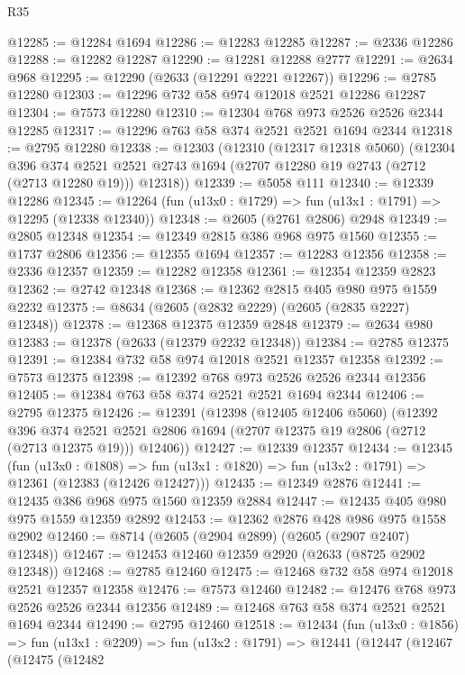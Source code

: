 \begin{lexlean}{R35}
\begin{coremodule}
@12285 := @12284 @1694
@12286 := @12283 @12285
@12287 := @2336 @12286
@12288 := @12282 @12287
@12290 := @12281 @12288 @2777
@12291 := @2634 @968
@12295 := @12290 (@2633 (@12291 @2221 @12267))
@12296 := @2785 @12280
@12303 := @12296 @732 @58 @974 @12018 @2521 @12286 @12287
@12304 := @7573 @12280
@12310 := @12304 @768 @973 @2526 @2526 @2344 @12285
@12317 := @12296 @763 @58 @374 @2521 @2521 @1694 @2344
@12318 := @2795 @12280
@12338 := @12303
    (@12310
      (@12317 @12318 @5060)
      (@12304
        @396
        @374
        @2521
        @2521
        @2743
        @1694
        (@2707 @12280 @19 @2743 (@2712 (@2713 @12280 @19)))
        @12318))
@12339 := @5058 @111
@12340 := @12339 @12286
@12345 := @12264 (fun (u13x0 : @1729) => fun (u13x1 : @1791) => @12295 (@12338 @12340))
@12348 := @2605 (@2761 @2806) @2948
@12349 := @2805 @12348
@12354 := @12349 @2815 @386 @968 @975 @1560
@12355 := @1737 @2806
@12356 := @12355 @1694
@12357 := @12283 @12356
@12358 := @2336 @12357
@12359 := @12282 @12358
@12361 := @12354 @12359 @2823
@12362 := @2742 @12348
@12368 := @12362 @2815 @405 @980 @975 @1559 @2232
@12375 := @8634 (@2605 (@2832 @2229) (@2605 (@2835 @2227) @12348))
@12378 := @12368 @12375 @12359 @2848
@12379 := @2634 @980
@12383 := @12378 (@2633 (@12379 @2232 @12348))
@12384 := @2785 @12375
@12391 := @12384 @732 @58 @974 @12018 @2521 @12357 @12358
@12392 := @7573 @12375
@12398 := @12392 @768 @973 @2526 @2526 @2344 @12356
@12405 := @12384 @763 @58 @374 @2521 @2521 @1694 @2344
@12406 := @2795 @12375
@12426 := @12391
    (@12398
      (@12405 @12406 @5060)
      (@12392
        @396
        @374
        @2521
        @2521
        @2806
        @1694
        (@2707 @12375 @19 @2806 (@2712 (@2713 @12375 @19)))
        @12406))
@12427 := @12339 @12357
@12434 := @12345
    (fun (u13x0 : @1808) =>
    fun (u13x1 : @1820) => fun (u13x2 : @1791) => @12361 (@12383 (@12426 @12427)))
@12435 := @12349 @2876
@12441 := @12435 @386 @968 @975 @1560 @12359 @2884
@12447 := @12435 @405 @980 @975 @1559 @12359 @2892
@12453 := @12362 @2876 @428 @986 @975 @1558 @2902
@12460 := @8714 (@2605 (@2904 @2899) (@2605 (@2907 @2407) @12348))
@12467 := @12453 @12460 @12359 @2920 (@2633 (@8725 @2902 @12348))
@12468 := @2785 @12460
@12475 := @12468 @732 @58 @974 @12018 @2521 @12357 @12358
@12476 := @7573 @12460
@12482 := @12476 @768 @973 @2526 @2526 @2344 @12356
@12489 := @12468 @763 @58 @374 @2521 @2521 @1694 @2344
@12490 := @2795 @12460
@12518 := @12434
    (fun (u13x0 : @1856) =>
    fun (u13x1 : @2209) =>
    fun (u13x2 : @1791) =>
    @12441
      (@12447
        (@12467
          (@12475
            (@12482

\end{coremodule}
\end{lexlean}
